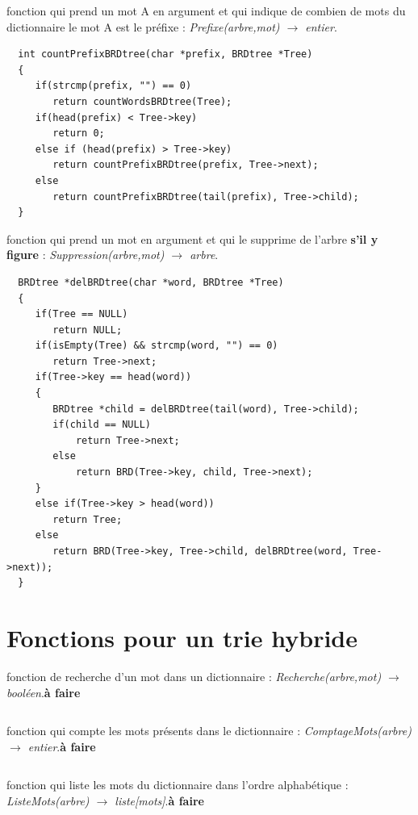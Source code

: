 \documentclass[a4paper,8pt]{report}
\begin{document}
fonction qui prend un mot A en argument et qui indique de combien de mots du dictionnaire le mot A est le pr\'efixe : \textit{Prefixe(arbre,mot) $\rightarrow$ entier}.
\begin{verbatim}
  int countPrefixBRDtree(char *prefix, BRDtree *Tree)
  {
     if(strcmp(prefix, "") == 0)
        return countWordsBRDtree(Tree);
     if(head(prefix) < Tree->key)
        return 0;
     else if (head(prefix) > Tree->key)
        return countPrefixBRDtree(prefix, Tree->next);
     else
        return countPrefixBRDtree(tail(prefix), Tree->child);
  }
\end{verbatim}

fonction qui prend un mot en argument et qui le supprime de l'arbre \textbf{s'il y figure} : \textit{Suppression(arbre,mot) $\rightarrow$ arbre}.
\begin{verbatim}
  BRDtree *delBRDtree(char *word, BRDtree *Tree)
  {
     if(Tree == NULL)
        return NULL;
     if(isEmpty(Tree) && strcmp(word, "") == 0)
        return Tree->next;
     if(Tree->key == head(word))
     {
        BRDtree *child = delBRDtree(tail(word), Tree->child);
        if(child == NULL)
            return Tree->next;
        else
            return BRD(Tree->key, child, Tree->next);
     }
     else if(Tree->key > head(word))
        return Tree;
     else
        return BRD(Tree->key, Tree->child, delBRDtree(word, Tree->next));
  }
\end{verbatim}

\section*{Fonctions pour un trie hybride}\label{sec:name}

fonction de recherche d'un mot dans un dictionnaire : \textit{Recherche(arbre,mot) $\rightarrow$ bool\'een}.\textbf{\`a faire}
\begin{verbatim}
\end{verbatim}

fonction qui compte les mots pr\'esents dans le dictionnaire : \textit{ComptageMots(arbre) $\rightarrow$ entier}.\textbf{\`a faire}
\begin{verbatim}
\end{verbatim}

fonction qui liste les mots du dictionnaire dans l'ordre alphab\'etique : \textit{ListeMots(arbre) $\rightarrow$ liste[mots]}.\textbf{\`a faire}
\begin{verbatim}
\end{verbatim}
\end{document}
